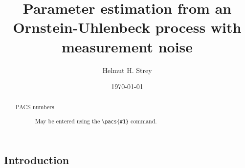 \documentclass[%
 reprint,
 amsmath,amssymb,
 aps,
]{revtex4-1}
\begin{document}

\title{Parameter estimation from an Ornstein-Uhlenbeck process with measurement noise}

\author{Helmut H. Strey}

\date{\today}%

\begin{abstract}
\begin{description}
\item[PACS numbers]
May be entered using the \verb+\pacs{#1}+ command.
\end{description}
\end{abstract}

\maketitle

\onecolumngrid
\subsection{Introduction}
\end{document}
